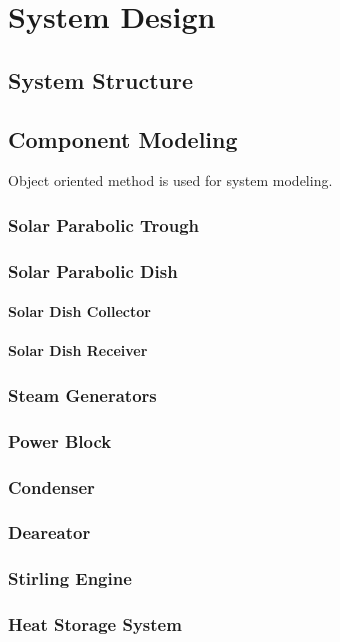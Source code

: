 \chapter{System Design}

\section{System Structure}
\section{Component Modeling}
Object oriented method is used for system modeling.
\subsection{Solar Parabolic Trough}
\subsection{Solar Parabolic Dish}
\subsubsection{Solar Dish Collector}
\subsubsection{Solar Dish Receiver}
\subsection{Steam Generators}
\subsection{Power Block}
\subsection{Condenser}
\subsection{Deareator}
\subsection{Stirling Engine}
\subsection{Heat Storage System}


